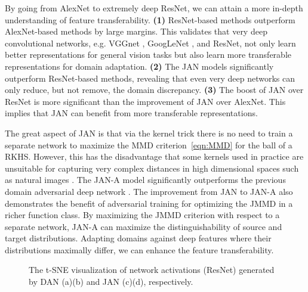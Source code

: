 \documentclass{article}
\begin{document}
By going from AlexNet to extremely deep ResNet, we can attain a more in-depth understanding of feature transferability.
\textbf{(1)} ResNet-based methods outperform AlexNet-based methods by large margins. This validates that very deep convolutional networks, e.g. VGGnet \cite{cite:ICLR15VGG}, GoogLeNet \cite{cite:CVPR15GoogleNet}, and ResNet, not only learn better representations for general vision tasks but also learn more transferable representations for domain adaptation. 
\textbf{(2)} The JAN models significantly outperform ResNet-based methods, revealing that even very deep networks can only reduce, but not remove, the domain discrepancy.
\textbf{(3)} The boost of JAN over ResNet is more significant than the improvement of JAN over AlexNet. This implies that JAN can benefit from more transferable representations. 

The great aspect of JAN is that via the kernel trick there is no need to train a separate network to maximize the MMD criterion~\eqref{eqn:MMD} for the ball of a RKHS. However, this has the disadvantage that some kernels used in practice are unsuitable for capturing very complex distances in high dimensional spaces such as natural images \cite{cite:Arxiv17WGAN}.
The JAN-A model significantly outperforms the previous domain adversarial deep network \cite{cite:ICML15RevGrad}. The improvement from JAN to JAN-A also demonstrates the benefit of adversarial training for optimizing the JMMD in a richer function class. By maximizing the JMMD criterion with respect to a separate network, JAN-A can maximize the distinguishability of source and target distributions. Adapting domains against deep features where their distributions maximally differ, we can enhance the feature transferability.

\begin{figure*}[tbp]
  \centering
  \hfil
  \hfil
  \hfil
  \vspace{-10pt}
  \caption{The t-SNE visualization of network activations (ResNet) generated by DAN (a)(b) and JAN (c)(d), respectively.}
  \vspace{-10pt}
\end{figure*}
\end{document}
